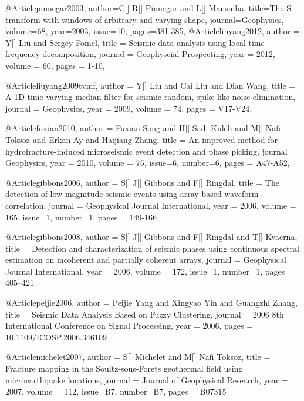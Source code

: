 @Article{pinnegar2003,
author={C[] R[] Pinnegar and L[] Mansinha},
title={The S-transform with windows of arbitrary and varying shape},
journal={Geophysics},
volume=68,
year=2003,
issue=10,
pages={381-385},
}
@Article{liuyang2012,
  author = 	 {Y[] Liu and Sergey Fomel},
  title = 	 {Seismic data analysis using local time-frequency decomposition},
  journal = 	 {Geophyscial Prospecting},
  year = 	 2012,
  volume =	 60,
  pages =	 {1-10},
}

@Article{liuyang2009tvmf,
  author = 	 {Y[] Liu and Cai Liu and Dian Wang},
  title = 	 {A 1D time-varying median filter for seismic random, spike-like noise elimination},
  journal = 	 {Geophysics},
  year = 	 2009,
  volume =	 74,
  pages =	 {V17-V24},
}

@Article{fuxian2010,
  author = 	 {Fuxian Song and H[] Sadi Kuleli and M[] Nafi Toks\"{o}z and Erkan Ay and Haijiang Zhang},
  title = 	 {An improved method for hydrofracture-induced microseismic event detection and phase picking},
  journal = 	 {Geophysics},
  year = 	 2010,
  volume =	 75,
  issue=6,
  number=6,
  pages =	 {A47-A52},
}

  @Article{gibbons2006,
  author = 	 {S[] J[] Gibbons and F[] Ringdal},
  title = 	 {The detection of low magnitude seismic events using array-based waveform correlation},
  journal = 	 {Geophysical Journal International},
  year = 	 2006,
  volume = 	 165,
  issue=1,
  number=1,
  pages = 	 {149-166}}
  
   @Article{gibbons2008,
  author = 	 {S[] J[] Gibbons and F[] Ringdal and T[] Kvaerna},
  title = 	 {Detection and characterization of seismic phases using continuous spectral estimation on incoherent and partially coherent arrays},
  journal = 	 {Geophysical Journal International},
  year = 	 2006,
  volume = 	 172,
  issue=1,
  number=1,
  pages = 	 {405–421}} 
  
   @Article{peijie2006,
  author = 	 {Peijie Yang and Xingyao Yin and Guangzhi Zhang},
  title = 	 {Seismic Data Analysis Based on Fuzzy Clustering},
  journal = 	 {2006 8th International Conference on Signal Processing},
  year = 	 2006,
  pages = 	 {10.1109/ICOSP.2006.346109}} 

    @Article{michelet2007,
  author = 	 {S[] Michelet and M[] Nafi Toks\"{o}z},
  title = 	 {Fracture mapping in the Soultz-sous-Forets geothermal field using microearthquake locations},
  journal = 	 {Journal of Geophysical Research},
  year = 	 2007,
  volume = 	 112,
  issue=B7,
  number=B7,
  pages = 	 {B07315}} 
 
